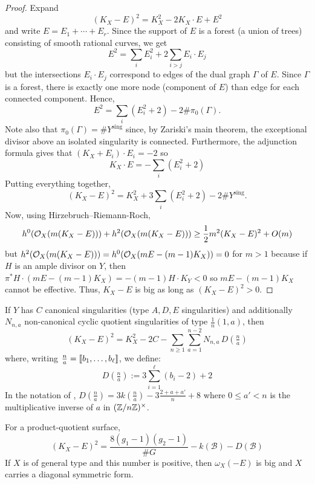 \documentclass[main.tex]{subfiles}
\begin{document}
\begin{proof}
Expand
\[ (K_X - E)^2 = K_X^2 - 2 K_X \cdot E + E^2 \]
and write $E = E_1 + \cdots + E_r$. Since the support of $E$ is a forest (a union of trees) consisting of smooth rational curves, we get 
\[ E^2 = \sum_i E_i^2 + 2 \sum_{i > j} E_i \cdot E_j \]
but the intersections $E_i \cdot E_j$ correspond to edges of the dual graph $\Gamma$ of $E$. Since $\Gamma$ is a forest, there is exactly one more node (component of $E$) than edge for each connected component. Hence,
\[ E^2 = \sum_i (E_i^2 + 2) - 2 \# \pi_0(\Gamma). \]
Note also that $\pi_0(\Gamma) = \# Y^{\mathrm{sing}}$ since, by Zariski's main theorem, the exceptional divisor above an isolated singularity is connected. Furthermore, the adjunction formula gives that $(K_X + E_i) \cdot E_i = -2$ so 
\[ K_X \cdot E = - \sum_i (E_i^2 + 2) \]
Putting everything together,
\[ (K_X - E)^2 = K_X^2 + 3 \sum_i (E_i^2 + 2) - 2 \# Y^{\mathrm{sing}}. \]
Now, using Hirzebruch--Riemann-Roch, 
\[ h^0(\mathcal{O}_{X}(m(K_X - E))) + h^2(\mathcal{O}_{X}(m(K_X - E))) \ge \frac{1}{2} m^2 (K_X - E)^2 + O(m) \]
but $h^2(\mathcal{O}_{X}(m(K_X - E))) = h^0(\mathcal{O}_{X}(m E - (m-1) K_X)) = 0$ for $m > 1$ because if $H$ is an ample divisor on $Y$, then $\pi^* H \cdot (m E - (m-1) K_X) = -(m-1) H \cdot K_Y < 0$ so $m E - (m-1) K_X$ cannot be effective. Thus, $K_X - E$ is big as long as $(K_X - E)^2 > 0$. 
\end{proof}

\begin{cor}  \label{cor:numerical_criterion}
If $Y$ has $C$ canonical singularities (type $A,D,E$ singularities) and additionally $N_{n,a}$ non-canonical cyclic quotient singularities of type $\frac{1}{n} (1,a)$, then
\[ (K_X - E)^2 = K_X^2 - 2 C - \sum_{n \ge 1} \sum_{a = 1}^{n-2}  N_{n,a} \, D(\tfrac{n}{a}) \]
where, writing $\frac{n}{a} = \llbracket b_1, \dots, b_{\ell} \rrbracket$, we define:
\[ D(\tfrac{n}{a}) := 3 \sum_{i=1}^{\ell} (b_i - 2) + 2 \]
In the notation of \cite{bauer:classification}, $D(\tfrac{n}{a}) = 3 k(\tfrac{n}{a}) - 3 \frac{2 + a + a'}{n} + 8$ where $0 \le a' < n$ is the multiplicative inverse of $a$ in $(\mathbb{Z} / n \mathbb{Z})^{\times}$. 
\end{cor}

\begin{cor}
For a product-quotient surface,
\[ (K_X - E)^2 = \frac{8(g_1 - 1)(g_2 - 1)}{\# G} - k(\mathcal{B}) - D(\mathcal{B}) \]
If $X$ is of general type and this number is positive, then $\omega_X(-E)$ is big and $X$ carries a diagonal symmetric form.
\end{cor}
\end{document}
